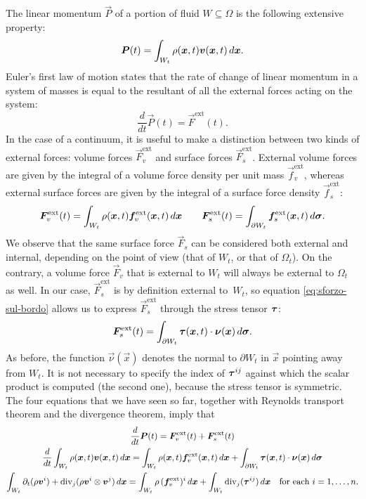 The linear momentum $\vec{P}$ of a portion of fluid $W \subseteq \Omega$
is the following extensive property:
\[
\bm{P}(t) = \int_{W_t} \rho(\bm{x},t) \bm{v}(\bm{x},t) \, d\bm{x}.
\]
Euler's first law of motion states that the rate of change of
linear momentum in a system of masses is equal to the resultant
of all the external forces acting on the system:
\[
\frac{d}{dt} \vec{P}(t) = \vec{F}^{\text{ext}}(t).
\]
In the case of a continuum, it is useful to make a distinction
between two kinds of external forces: volume forces $\vec{F}_v^{\text{ext}}$
and surface forces $\vec{F}_s^{\text{ext}}$. External volume forces are
given by the integral of a volume force density per unit mass
$\vec{f}_v^{\text{ext}}$, whereas external surface forces are given
by the integral of a surface force density $\vec{f}_s^{\text{ext}}$:
\[
\bm{F}_v^{\text{ext}}(t)
= \int_{W_t} \rho(\bm{x},t) \bm{f}_v^{\text{ext}}(\bm{x},t) \, d\bm{x}
\qquad \bm{F}_s^{\text{ext}}(t)
= \int_{\partial W_t} \bm{f}_s^{\text{ext}}(\bm{x},t) \, d\bm{\sigma}.
\]
We observe that the same surface force $\vec{F}_s$ can be
considered both external and internal, depending on the point of
view (that of $W_t$, or that of $\Omega_t$).
On the contrary, a volume force $\vec{F}_v$ that is external to
$W_t$ will always be external to $\Omega_t$ as well.
In our case, $\vec{F}_s^{\text{ext}}$ is by definition external
to~$W_t$, so equation \eqref{eq:sforzo-sul-bordo} allows us
to express $\vec{F}_s^{\text{ext}}$ through the stress tensor $\bm{\tau}$:
\[
\bm{F}_s^{\text{ext}}(t)
= \int_{\partial W_t} \bm{\tau}(\bm{x},t) \cdot \bm{\nu}(\bm{x}) \, d\bm{\sigma}.
\]
As before, the function $\vec{\nu}(\vec{x})$ denotes the normal to
$\partial W_t$ in $\vec{x}$ pointing away from $W_t$.
It is not necessary to specify the index of $\bm{\tau}^{ij}$ against
which the scalar product is computed (the second one),
because the stress tensor is symmetric.
The four equations that we have seen so far, together with
Reynolds transport theorem and the divergence theorem, imply that
\begin{gather*}
\frac{d}{dt} \bm{P}(t) = \bm{F}_v^{\text{ext}}(t) + \bm{F}_s^{\text{ext}}(t) \\
\frac{d}{dt} \int_{W_t} \rho(\bm{x},t) \bm{v}(\bm{x},t) \, d\bm{x}
	= \int_{W_t} \rho(\bm{x},t) \bm{f}_v^{\text{ext}}(\bm{x},t) \, d\bm{x}
	+ \int_{\partial W_t} \bm{\tau}(\bm{x},t) \cdot \bm{\nu}(\bm{x}) \, d\bm{\sigma} \\
\int_{W_t} \partial_t (\rho \bm{v}^i)
	+ \operatorname{div}_j(\rho \bm{v}^i \otimes \bm{v}^j) \, d\bm{x}
	= \int_{W_t} \rho \, (\bm{f}_v^{\text{ext}})^i \, d\bm{x}
	+ \int_{W_t} \operatorname{div}_j(\bm{\tau}^{ij}) \, d\bm{x}
	\quad \text{for each $i = 1,\dots,n$}.
\end{gather*}
